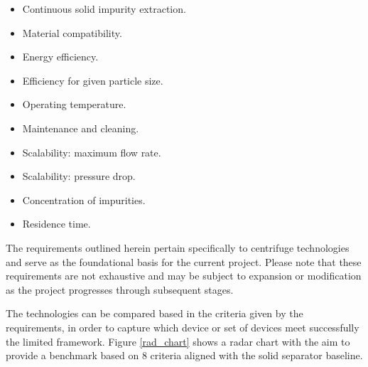 \begin{itemize}
	\item Continuous solid impurity extraction.
	\item Material compatibility.
	\item Energy efficiency.
	\item Efficiency for given particle size. 
	\item Operating temperature.
	\item Maintenance and cleaning.
	\item Scalability: maximum flow rate.
	\item Scalability: pressure drop.
	\item Concentration of impurities. 
	\item Residence time.
\end{itemize}

\begin{tcolorbox}[colback=gray!5!white,colframe=gray!75!black,title=Disclaimer]
	The requirements outlined herein pertain specifically to centrifuge technologies and serve as the foundational basis for the current project. Please note that these requirements are not exhaustive and may be subject to expansion or modification as the project progresses through subsequent stages. 
\end{tcolorbox}

\noindent The technologies can be compared based in the criteria given by the requirements, in order to capture which device or set of devices meet successfully the limited framework. Figure \ref{rad_chart} shows a radar chart with the aim to provide a benchmark based on 8 criteria aligned with the solid separator baseline.  

